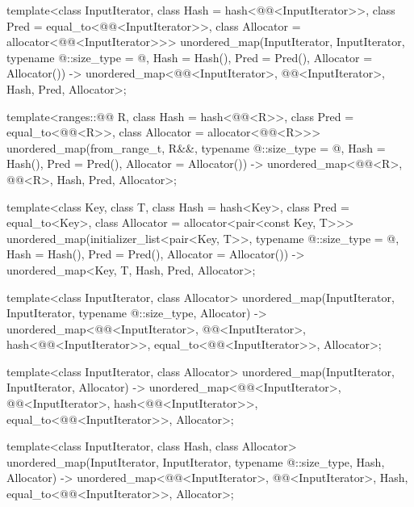 \begin{codeblock}
{  template<class InputIterator,
           class Hash = hash<@@<InputIterator>>,
           class Pred = equal_to<@@<InputIterator>>,
           class Allocator = allocator<@@<InputIterator>>>
    unordered_map(InputIterator, InputIterator, typename @\seebelow@::size_type = @\seebelow@,
                  Hash = Hash(), Pred = Pred(), Allocator = Allocator())
      -> unordered_map<@@<InputIterator>, @@<InputIterator>, Hash, Pred,
                       Allocator>;

  template<ranges::@@ R, class Hash = hash<@@<R>>,
           class Pred = equal_to<@@<R>>,
           class Allocator = allocator<@@<R>>>
    unordered_map(from_range_t, R&&, typename @\seebelow@::size_type = @\seebelow@,
                  Hash = Hash(), Pred = Pred(), Allocator = Allocator())
      -> unordered_map<@@<R>, @@<R>, Hash, Pred, Allocator>;

  template<class Key, class T, class Hash = hash<Key>,
           class Pred = equal_to<Key>, class Allocator = allocator<pair<const Key, T>>>
    unordered_map(initializer_list<pair<Key, T>>,
                  typename @\seebelow@::size_type = @\seebelow@, Hash = Hash(),
                  Pred = Pred(), Allocator = Allocator())
      -> unordered_map<Key, T, Hash, Pred, Allocator>;

  template<class InputIterator, class Allocator>
    unordered_map(InputIterator, InputIterator, typename @\seebelow@::size_type, Allocator)
      -> unordered_map<@@<InputIterator>, @@<InputIterator>,
                       hash<@@<InputIterator>>,
                       equal_to<@@<InputIterator>>, Allocator>;

  template<class InputIterator, class Allocator>
    unordered_map(InputIterator, InputIterator, Allocator)
      -> unordered_map<@@<InputIterator>, @@<InputIterator>,
                       hash<@@<InputIterator>>,
                       equal_to<@@<InputIterator>>, Allocator>;

  template<class InputIterator, class Hash, class Allocator>
    unordered_map(InputIterator, InputIterator, typename @\seebelow@::size_type, Hash, Allocator)
      -> unordered_map<@@<InputIterator>, @@<InputIterator>, Hash,
                       equal_to<@@<InputIterator>>, Allocator>;

}
\end{codeblock}
